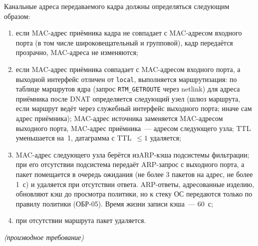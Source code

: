 \documentclass[12pt,a4paper,final]{article}
\newenvironment{reqs}
  {\begin{description}[style=sameline,leftmargin=2.2cm,labelwidth=2.0cm,
     labelsep=0.2cm,font=\normalfont\bfseries,itemsep=3pt]}
  {\end{description}}
\newcommand{\der}{\textit{(производное требование)}}
\begin{document}
\begin{reqs}
\item[ОБР-08] Канальные адреса передаваемого кадра должны определяться
  следующим образом:
  \begin{enumerate}
  \item если MAC-адрес приёмника кадра не совпадает с MAC-адресом входного
    порта (в том числе широковещательный и групповой), кадр передаётся
    прозрачно, MAC-адреса не изменяются;
  \item если MAC-адрес приёмника совпадает с MAC-адресом входного порта,
    а выходной интерфейс отличен от \texttt{local}, выполняется
    маршрутизация: по таблице маршрутов ядра (запрос \texttt{RTM\_GETROUTE}
    через netlink) для адреса приёмника после DNAT определяется следующий
    узел (шлюз маршрута, если маршрут ведёт через служебный интерфейс
    выходного порта; иначе сам адрес приёмника); MAC-адрес источника
    заменяется MAC-адресом выходного порта, MAC-адрес приёмника~— адресом
    следующего узла; TTL уменьшается на~1, датаграмма с TTL~$\le 1$
    удаляется;
  \item MAC-адрес следующего узла берётся из\linebreak[2] ARP-кэша подсистемы фильтрации;
    при его отсутствии подсистема передаёт ARP-запрос с выходного порта,
    а пакет помещается в очередь ожидания (не более 3 пакетов на адрес,
    не более 1~с) и удаляется при отсутствии ответа. ARP-ответы, адресованные
    изделию, обновляют кэш до просмотра политики, но к стеку ОС
    передаются только по правилу политики (ОБР-05). Время жизни записи
    кэша~— 60~с;
  \item при отсутствии маршрута пакет удаляется.
  \end{enumerate}
  \der


\end{reqs}
\end{document}
